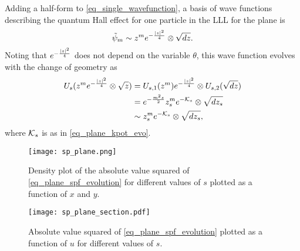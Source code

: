 \documentclass[notas.tex]{subfiles}
\begin{document}
Adding a half-form to \eqref{eq_single_wavefunction}, a basis of wave functions describing the quantum Hall effect for one particle in the LLL for the plane is 
\begin{equation}
	\tilde \psi_m \sim z^m e^{- \frac{\left|z\right|^2}{4}} \otimes \sqrt{dz}.
\end{equation}
Noting that $e^{-\frac{\left|z\right|^2}{4}}$ does not depend on the variable $\theta$, this wave function evolves with the change of geometry as
\begin{align*}
U_s(z^m e^{-\frac{\left|z\right|^2}{4}} \otimes \sqrt{z}) &=  U_{s,1}(z^m) e^{-\frac{\left|z\right|^2}{4}} \otimes U_{s,2}(\sqrt{dz}) \\
&= e^{-\frac{m^2s}{2}}z_{s}^m e^{-\mathcal{K}_s} \otimes \sqrt{dz_s} \\
&\sim z_{s}^m e^{-\mathcal{K}_s} \otimes \sqrt{dz_s}, \nonumber
\end{align*}
where $\mathcal{K}_s$ is as in \eqref{eq_plane_kpot_evo}.

\begin{figure}[htbp]
	\centering
	\texttt{[image: sp\_plane.png]}
	\caption{Density plot of the absolute value squared of \eqref{eq_plane_spf_evolution} for different values of $s$ plotted as a function of $x$ and $y$.}
	\label{fig_spf_plane_evolution}
\end{figure}

\begin{figure}[htbp]
	\centering
	\texttt{[image: sp\_plane\_section.pdf]}
	\caption{Absolute value squared of \eqref{eq_plane_spf_evolution} plotted as a function of $u$ for different values of $s$.}
	\label{fig_spf_plane_evolution_sec}
\end{figure}
\end{document}
